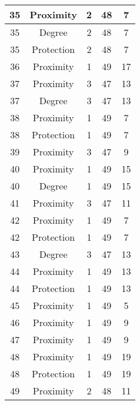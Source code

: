 \documentclass[results.tex]{subfiles}
\begin{document}
\begin{center}
\begin{tabular}{| c || c | c | c | c |}
    \hline
    35 & Proximity & 2 & 48 & 7 \\ 
    \hline
    35 & Degree & 2 & 48 & 7 \\ 
    \hline
    35 & Protection & 2 & 48 & 7 \\ 
    \hline
    36 & Proximity & 1 & 49 & 17 \\ 
    \hline
    37 & Proximity & 3 & 47 & 13 \\ 
    \hline
    37 & Degree & 3 & 47 & 13 \\ 
    \hline
    38 & Proximity & 1 & 49 & 7 \\ 
    \hline
    38 & Protection & 1 & 49 & 7 \\ 
    \hline
    39 & Proximity & 3 & 47 & 9 \\ 
    \hline
    40 & Proximity & 1 & 49 & 15 \\ 
    \hline
    40 & Degree & 1 & 49 & 15 \\ 
    \hline
    41 & Proximity & 3 & 47 & 11 \\ 
    \hline
    42 & Proximity & 1 & 49 & 7 \\ 
    \hline
    42 & Protection & 1 & 49 & 7 \\ 
    \hline
    43 & Degree & 3 & 47 & 13 \\ 
    \hline
    44 & Proximity & 1 & 49 & 13 \\ 
    \hline
    44 & Protection & 1 & 49 & 13 \\ 
    \hline
    45 & Proximity & 1 & 49 & 5 \\ 
    \hline
    46 & Proximity & 1 & 49 & 9 \\ 
    \hline
    47 & Proximity & 1 & 49 & 9 \\ 
    \hline
    48 & Proximity & 1 & 49 & 19 \\ 
    \hline
    48 & Protection & 1 & 49 & 19 \\ 
    \hline
    49 & Proximity & 2 & 48 & 11 \\ 
    \hline   \end{tabular}
\end{center}
\end{document}
